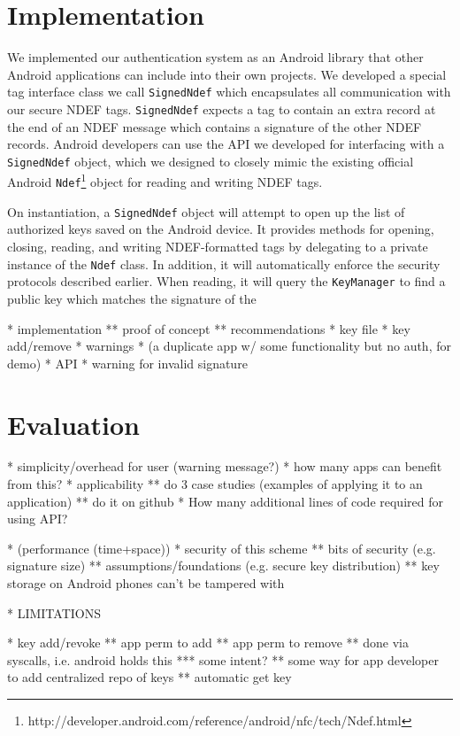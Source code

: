 \documentclass[12pt]{article}
\begin{document}
\section{Implementation}
We implemented our authentication system as an Android library that other Android applications can include into their own projects.
We developed a special tag interface class we call \texttt{SignedNdef} which encapsulates all communication with our secure NDEF tags.
\texttt{SignedNdef} expects a tag to contain an extra record at the end of an NDEF message which contains a signature of the other NDEF records.
Android developers can use the API we developed for interfacing with a \texttt{SignedNdef} object, which we designed to closely mimic the existing official Android \texttt{Ndef}\footnote{http://developer.android.com/reference/android/nfc/tech/Ndef.html} object for reading and writing NDEF tags.

On instantiation, a \texttt{SignedNdef} object will attempt to open up the list of authorized keys saved on the Android device.
It provides methods for opening, closing, reading, and writing NDEF-formatted tags by delegating to a private instance of the \texttt{Ndef} class.
In addition, it will automatically enforce the security protocols described earlier.
When reading, it will query the \texttt{KeyManager} to find a public key which matches the signature of the

* implementation
** proof of concept
** recommendations
* key file
* key add/remove
* warnings
* (a duplicate app w/ some functionality but no auth, for demo)
* API
* warning for invalid signature

\section{Evaluation}
* simplicity/overhead for user (warning message?)
* how many apps can benefit from this?
* applicability
** do 3 case studies (examples of applying it to an application)
** do it on github
* How many additional lines of code required for using API?

* (performance (time+space))
* security of this scheme
** bits of security (e.g. signature size)
** assumptions/foundations (e.g. secure key distribution)
** key storage on Android phones can't be tampered with

* LIMITATIONS

* key add/revoke
** app perm to add
** app perm to remove
** done via syscalls, i.e. android holds this
*** some intent?
** some way for app developer to add centralized repo of keys
** automatic get key
\end{document}
